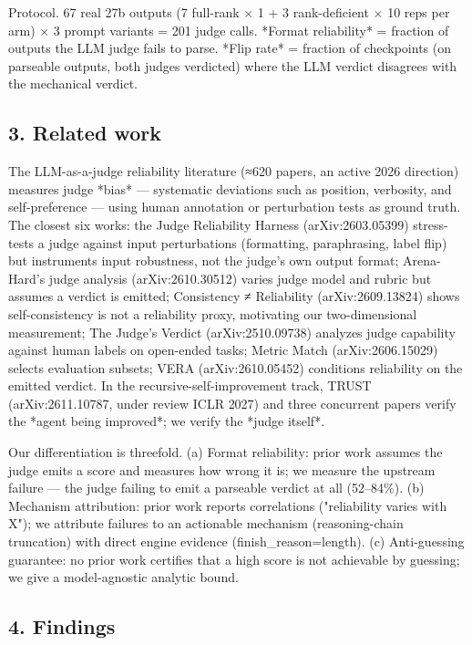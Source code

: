 \documentclass[10pt]{article}
\begin{document}
Protocol. 67 real 27b outputs (7 full-rank × 1 + 3 rank-deficient × 10 reps per arm) × 3 prompt variants = 201 judge calls. *Format reliability* = fraction of outputs the LLM judge fails to parse. *Flip rate* = fraction of checkpoints (on parseable outputs, both judges verdicted) where the LLM verdict disagrees with the mechanical verdict.

\subsection*{3. Related work}

The LLM-as-a-judge reliability literature (≈620 papers, an active 2026 direction) measures judge *bias* — systematic deviations such as position, verbosity, and self-preference — using human annotation or perturbation tests as ground truth. The closest six works: the Judge Reliability Harness (arXiv:2603.05399) stress-tests a judge against input perturbations (formatting, paraphrasing, label flip) but instruments input robustness, not the judge's own output format; Arena-Hard's judge analysis (arXiv:2610.30512) varies judge model and rubric but assumes a verdict is emitted; Consistency ≠ Reliability (arXiv:2609.13824) shows self-consistency is not a reliability proxy, motivating our two-dimensional measurement; The Judge's Verdict (arXiv:2510.09738) analyzes judge capability against human labels on open-ended tasks; Metric Match (arXiv:2606.15029) selects evaluation subsets; VERA (arXiv:2610.05452) conditions reliability on the emitted verdict. In the recursive-self-improvement track, TRUST (arXiv:2611.10787, under review ICLR 2027) and three concurrent papers verify the *agent being improved*; we verify the *judge itself*.

Our differentiation is threefold. (a) Format reliability: prior work assumes the judge emits a score and measures how wrong it is; we measure the upstream failure — the judge failing to emit a parseable verdict at all (52–84\%). (b) Mechanism attribution: prior work reports correlations ("reliability varies with X"); we attribute failures to an actionable mechanism (reasoning-chain truncation) with direct engine evidence (finish\_reason=length). (c) Anti-guessing guarantee: no prior work certifies that a high score is not achievable by guessing; we give a model-agnostic analytic bound.

\subsection*{4. Findings}
\end{document}
